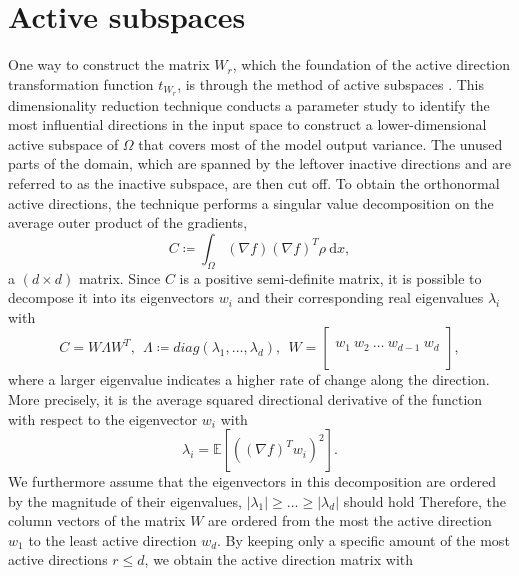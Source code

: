 \documentclass[
  a4paper,  %
  twoside,  %
  bibliography=totoc,
  headsepline,
  cleardoublepage=empty,
  parskip=half,
  draft=false
]{scrbook}
\begin{document}
\section{Active subspaces}
\label{sec:as}

One way to construct the matrix $W_r$, which the foundation of the active direction transformation function $t_{W_r}$, is through the method of active subspaces \cite{Constantine2015}.
This dimensionality reduction technique conducts a parameter study to identify the most influential directions in the input space to construct a lower-dimensional active subspace of $\Omega$ that covers most of the model output variance.
The unused parts of the domain, which are spanned by the leftover inactive directions and are referred to as the inactive subspace, are then cut off.
To obtain the orthonormal active directions, the technique performs a singular value decomposition on the average outer product of the gradients,
\begin{equation}
C \coloneqq \int_{\Omega} (\nabla f) (\nabla f)^T \rho ~ \mathrm{d}x,
\label{eq:as_c}
\end{equation}
a $(d \times d)$ matrix.
Since $C$ is a positive semi-definite matrix, it is possible to decompose it into its eigenvectors $w_i$ and their corresponding real eigenvalues $\lambda_i$ with
\begin{equation}
C = W \Lambda W^T, ~~ \Lambda \coloneqq diag(\lambda_1, \dots, \lambda_d), ~~ W =
  \begin{bmatrix}
  \\
    w_1 ~ w_2 ~ \dots ~ w_{d-1} ~ w_d\\
    \\
  \end{bmatrix},
\end{equation}
where a larger eigenvalue indicates a higher rate of change along the direction.
More precisely, it is the average squared directional derivative of the function with respect to the eigenvector $w_i$ \cite{Constantine2014} with
\begin{equation}
\lambda_i=\mathds{E}\left[\left(\left(\nabla f\right)^T w_i\right)^2\right].
\label{eigenvalues}
\end{equation}
%
We furthermore assume that the eigenvectors in this decomposition are ordered by the magnitude of their eigenvalues, \ie $|\lambda_1| \geq \dots \geq |\lambda_d|$ should hold
Therefore, the column vectors of the matrix $W$ are ordered from the most the active direction $w_1$ to the least active direction $w_d$.
By keeping only a specific amount of the most active directions $r \leq d$, we obtain the active direction matrix with
\end{document}
